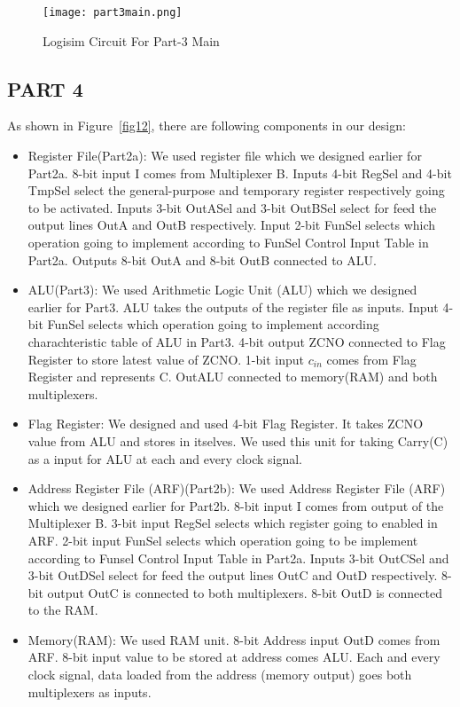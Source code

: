 \documentclass[pdftex,12pt,a4paper]{article}
\begin{document}
\begin{figure}[H]
	\centering
	\texttt{[image: part3main.png]}	
	\caption{Logisim Circuit For Part-3 Main}
	\label{fig11}
\end{figure}


\subsection{PART 4}
As shown in Figure~\ref{fig12}, there are following components in our design:
\begin{itemize}
\item Register File(Part2a): We used register file which we designed earlier for Part2a. 8-bit input I comes from Multiplexer B. Inputs 4-bit RegSel and 4-bit TmpSel select the general-purpose and temporary register respectively going to be activated. Inputs 3-bit OutASel and 3-bit OutBSel select for feed the output lines OutA and OutB respectively. Input 2-bit FunSel selects which operation going to implement according to FunSel Control Input Table in Part2a. Outputs 8-bit OutA and 8-bit OutB connected to ALU.
\item ALU(Part3): We used Arithmetic Logic Unit (ALU) which we designed earlier for Part3. ALU takes the outputs of the register file as inputs. Input 4-bit FunSel selects which operation going to implement according charachteristic table of ALU in Part3. 4-bit output ZCNO connected to Flag Register to store latest value of ZCNO. 1-bit input $c_{in}$ comes from Flag Register and represents C. OutALU connected to memory(RAM) and both multiplexers.
\item Flag Register: We designed and used 4-bit Flag Register. It takes ZCNO value from ALU and stores in itselves. We used this unit for taking Carry(C) as a input for ALU at each and every clock signal.
\item Address Register File (ARF)(Part2b): We used Address Register File (ARF) which we designed earlier for Part2b. 8-bit input I comes from output of the Multiplexer B. 3-bit input RegSel selects which register going to enabled in ARF. 2-bit input FunSel selects which operation going to be implement according to Funsel Control Input Table in Part2a. Inputs 3-bit OutCSel and 3-bit OutDSel select for feed the output lines OutC and OutD respectively. 8-bit output OutC is connected to both multiplexers. 8-bit OutD is connected to the RAM.
\item Memory(RAM): We used RAM unit. 8-bit Address input OutD comes from ARF. 8-bit input value to be stored at address comes ALU. Each and every clock signal, data loaded from the address (memory output) goes both multiplexers as inputs.

\end{itemize}
\end{document}

